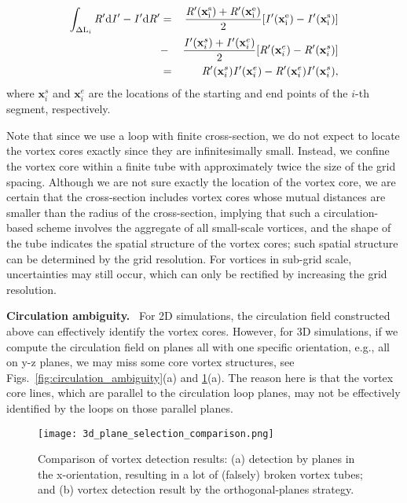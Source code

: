 \documentclass[10pt,journal,compsoc,twoside]{IEEEtran}
\begin{document}
	\begin{eqnarray}
		\int_{\Delta \mathrm{L}_i} \mathit{R' \mathrm{d}I' - I' \mathrm{d}R'} &=& 
		\rm
		\frac{\mathit{R'}(\mathbf{x}_i^s)+\mathit{R'}(\mathbf{x}_i^e)}{2} [\mathit{I'}(\mathbf{x}_i^e) - \mathit{I'}(\mathbf{x}_i^s)]  \cr
		\rm
		&-&  \frac{\mathit{I'}(\mathbf{x}_i^s)+\mathit{I'}(\mathbf{x}_i^e)}{2} [\mathit{R'}(\mathbf{x}_i^e) - \mathit{R'}(\mathbf{x}_i^s)] \cr
		\rm
		&=& \mathit{R'}(\mathbf{x}_i^s) \mathit{I'}(\mathbf{x}_i^e) - \mathit{R'}(\mathbf{x}_i^e) \mathit{I'}(\mathbf{x}_i^s),
	\end{eqnarray}
	where $\mathbf{x}_i^s$ and $\mathbf{x}_i^e$ are the locations of the starting and end points of the $i$-th segment, respectively.
	
	Note that since we use a loop with finite cross-section, we do not expect to locate the vortex cores exactly since they are infinitesimally small.
	Instead, we confine the vortex core within a finite tube with approximately twice the size of the grid spacing.
	Although we are not sure exactly the location of the vortex core, we are certain that the cross-section includes vortex cores whose mutual distances are smaller than the radius of the cross-section, implying that such a circulation-based scheme involves the aggregate of all small-scale vortices, and the shape of the tube indicates the spatial structure of the vortex cores; such spatial structure can be determined by the grid resolution.
	For vortices in sub-grid scale, uncertainties may still occur, which can only be rectified by increasing the grid resolution.
	
	\vspace{0.15cm}
	\noindent
	\textbf{Circulation ambiguity.} \
	For 2D simulations, the circulation field constructed above can effectively identify the vortex cores.
	However, for 3D simulations, if we compute the circulation field on planes all with one specific orientation, e.g., all on y-z planes, we may miss some core vortex structures, see Figs.~\ref{fig:circulation_ambiguity}(a) and \ref{fig:3d_plane_selection_comparison}(a).
	The reason here is that the vortex core lines, which are parallel to the circulation loop planes, may not be effectively identified by the loops on those parallel planes.
	
	\begin{figure}[!t]
		\centering
		\texttt{[image: 3d\_plane\_selection\_comparison.png]}
		\caption{Comparison of vortex detection results:
			(a) detection by planes in the x-orientation, resulting in a lot of (falsely) broken vortex tubes; and 
			(b) vortex detection result by the orthogonal-planes strategy.}
		\label{fig:3d_plane_selection_comparison}
	\end{figure}
	
\end{document}
